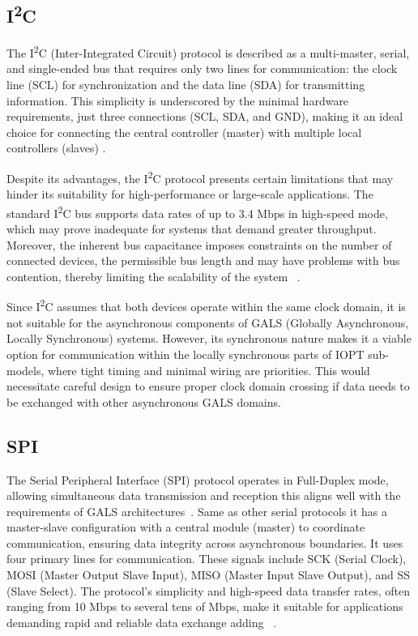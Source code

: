 \subsection{I\textsuperscript{2}C}
\label{subsub:i2c}

The I\textsuperscript{2}C  (Inter-Integrated Circuit) protocol is described as a multi-master, serial, and single-ended bus that requires only two lines for communication: the clock line (SCL) for synchronization and the data line (SDA) for transmitting information. This simplicity is underscored by the minimal hardware requirements, just three connections (SCL, SDA, and GND), making it an ideal choice for connecting the central controller (master) with multiple local controllers (slaves) \cite{i2c}.

Despite its advantages, the I\textsuperscript{2}C  protocol presents certain limitations that may hinder its suitability for high-performance or large-scale applications. The standard I\textsuperscript{2}C bus supports data rates of up to 3.4 Mbps in high-speed mode, which may prove inadequate for systems that demand greater throughput. Moreover, the inherent bus capacitance imposes constraints on the number of connected devices, the permissible bus length and may have problems with bus contention, thereby limiting the scalability of the system ~\cite{I2Cv2}.

Since I\textsuperscript{2}C assumes that both devices operate within the same clock domain, it is not suitable for the asynchronous components of GALS (Globally Asynchronous, Locally Synchronous) systems. However, its synchronous nature makes it a viable option for communication within the locally synchronous parts of IOPT sub-models, where tight timing and minimal wiring are priorities. This would necessitate careful design to ensure proper clock domain crossing if data needs to be exchanged with other asynchronous GALS domains.

\subsection{SPI}
\label{subsub:spi}

The Serial Peripheral Interface (SPI) protocol operates in Full-Duplex mode, allowing simultaneous data transmission and reception this aligns well with the requirements of GALS architectures~\cite{spisite}. Same as other serial protocols it has a master-slave configuration with a central module (master) to coordinate communication, ensuring data integrity across asynchronous boundaries. It uses four primary lines for communication. These signals include SCK (Serial Clock), MOSI (Master Output Slave Input), MISO (Master Input Slave Output), and SS (Slave Select). The protocol's simplicity and high-speed data transfer rates, often ranging from 10 Mbps to several tens of Mbps, make it suitable for applications demanding rapid and reliable data exchange adding ~\cite{spisite}.

